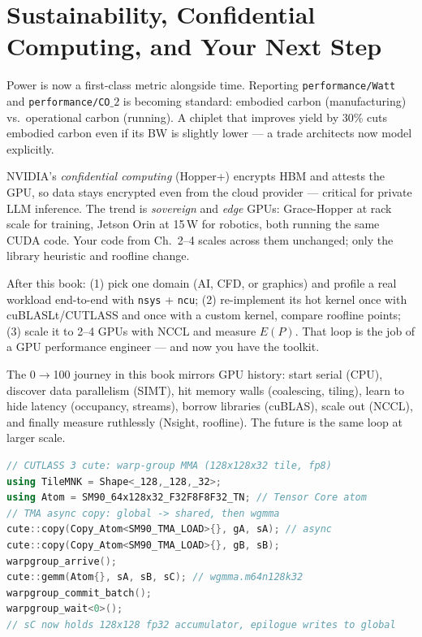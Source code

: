 \section{Sustainability, Confidential Computing, and Your Next Step}
Power is now a first-class metric alongside time. Reporting \texttt{performance/Watt} and \texttt{performance/CO$\_{2}$} is becoming standard: embodied carbon (manufacturing) vs.\ operational carbon (running). A chiplet that improves yield by 30\% cuts embodied carbon even if its BW is slightly lower --- a trade architects now model explicitly.

NVIDIA's \emph{confidential computing} (Hopper+) encrypts HBM and attests the GPU, so data stays encrypted even from the cloud provider --- critical for private LLM inference. The trend is \emph{sovereign} and \emph{edge} GPUs: Grace-Hopper at rack scale for training, Jetson Orin at 15\,W for robotics, both running the same CUDA code. Your code from Ch.~2--4 scales across them unchanged; only the library heuristic and roofline change.

\begin{example}
After this book: (1) pick one domain (AI, CFD, or graphics) and profile a real workload end-to-end with \texttt{nsys} + \texttt{ncu}; (2) re-implement its hot kernel once with cuBLASLt/CUTLASS and once with a custom kernel, compare roofline points; (3) scale it to 2--4 GPUs with NCCL and measure $E(P)$. That loop is the job of a GPU performance engineer --- and now you have the toolkit.
\end{example}

\begin{remark}
The 0$\to$100 journey in this book mirrors GPU history: start serial (CPU), discover data parallelism (SIMT), hit memory walls (coalescing, tiling), learn to hide latency (occupancy, streams), borrow libraries (cuBLAS), scale out (NCCL), and finally measure ruthlessly (Nsight, roofline). The future is the same loop at larger scale.
\end{remark}

\begin{lstlisting}[language=C++, caption={Hopper wgmma: warp-group matmul using CUTLASS 3.x / cute. Four warps cooperate.}]
// CUTLASS 3 cute: warp-group MMA (128x128x32 tile, fp8)
using TileMNK = Shape<_128,_128,_32>;
using Atom = SM90_64x128x32_F32F8F8F32_TN; // Tensor Core atom
// TMA async copy: global -> shared, then wgmma
cute::copy(Copy_Atom<SM90_TMA_LOAD>{}, gA, sA); // async
cute::copy(Copy_Atom<SM90_TMA_LOAD>{}, gB, sB);
warpgroup_arrive();
cute::gemm(Atom{}, sA, sB, sC); // wgmma.m64n128k32
warpgroup_commit_batch();
warpgroup_wait<0>();
// sC now holds 128x128 fp32 accumulator, epilogue writes to global
\end{lstlisting}

